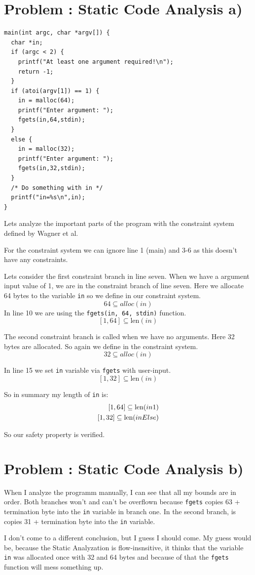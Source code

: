 \documentclass[12pt]{scrartcl}
\newcounter{exnum}
\newcommand{\exercise}[1]{\section*{Problem \theexnum\stepcounter{exnum}: #1}}
\begin{document}
\setcounter{exnum}{2}
\exercise{Static Code Analysis a)}

\begin{lstlisting}
main(int argc, char *argv[]) {
  char *in;
  if (argc < 2) {
    printf("At least one argument required!\n");
    return -1;
  }
  if (atoi(argv[1]) == 1) {
    in = malloc(64);
    printf("Enter argument: ");
    fgets(in,64,stdin);
  }
  else {
    in = malloc(32);
    printf("Enter argument: ");
    fgets(in,32,stdin);
  }
  /* Do something with in */
  printf("in=%s\n",in);
}
\end{lstlisting}

Lets analyze the important parts of the program with the constraint system defined by Wagner et al.

For the constraint system we can ignore line 1 (main) and 3-6 as this doesn't have any constraints.

Lets consider the first constraint branch in line seven. When we have a argument input value of 1, we are in the constraint branch of line seven. Here we allocate 64 bytes to the variable \texttt{in} so we define in our constraint system.\[ 64 \subseteq alloc(in) \]
In line 10 we are using the \texttt{fgets(in, 64, stdin)} function.
\[ 
  [1, 64] \subseteq \text{len}(in)
\]


The second constraint branch is called when we have no arguments.
Here 32 bytes are allocated. So again we define in the constraint system.\[ 32 \subseteq alloc(in) \]

In line 15 we set \texttt{in} variable via \texttt{fgets} with user-input.
\[ 
  [1, 32] \subseteq \text{len}(in)
\]

So in summary my length of \texttt{in} is:
\[
  \begin{aligned}
    \relax[1,64] \subseteq  \text{len}(in1) \\
    [1,32] \subseteq  \text{len}(inElse) 
  \end{aligned}
\]

So our safety property is verified.

\setcounter{exnum}{2}
\exercise{Static Code Analysis b)}
When I analyze the programm manually, I can see that all my bounds are in order.
Both branches won't and can't be overflown because \texttt{fgets} copies 63 + termination byte into the \texttt{in} variable in branch one. In the second branch, is copies 31 + termination byte into the \texttt{in} variable.

I don't come to a different conclusion, but I guess I should come.
My guess would be, because the Static Analyzation is flow-insnsitive, it thinks that the variable \texttt{in} was allocated once with 32 and 64 bytes and because of that the \texttt{fgets} function will mess something up.
\end{document}
